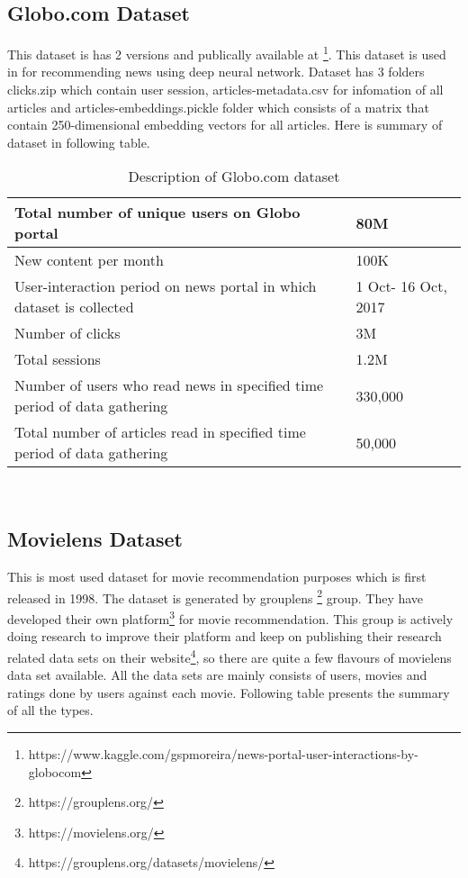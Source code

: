 \subsection{Globo.com Dataset}
This dataset is has 2 versions and publically available at \footnote{https://www.kaggle.com/gspmoreira/news-portal-user-interactions-by-globocom}. This dataset is used in \cite{N24} for recommending news using deep neural network. Dataset has 3 folders clicks.zip which contain user session, articles-metadata.csv for infomation of all articles and articles-embeddings.pickle folder which consists of a matrix that contain 250-dimensional embedding vectors for all articles.  Here is summary of 
dataset in following table.
\\
\begin{table}[!htbp] 
\centering
\footnotesize
\def\arraystretch{1.4}%
\centering
\begin{tabular}{|p{8cm}|p{2cm}|}
\hline
Total number of unique users on Globo portal & 80M
\\
\hline 
New content per month & 100K
\\
\hline 
User-interaction period on news portal in which dataset is collected& 1 Oct- 16 Oct, 2017
\\
\hline 
Number of clicks & 3M
\\
\hline 
Total sessions &1.2M
\\
\hline 
Number of users who read news in specified time period of data gathering & 330,000
\\
\hline 
Total number of articles read in specified time period of data gathering & 50,000
\\
\hline
\end{tabular}

\caption{Description of Globo.com dataset}
\label{table:6}
\end{table}
\\
\subsection{Movielens Dataset}
This is most used dataset for movie recommendation purposes which is first released in 1998. The dataset is generated by grouplens \footnote{https://grouplens.org/} group. They have developed their own platform\footnote{https://movielens.org/} for movie recommendation. This group is actively doing research to improve their platform and keep on publishing their research related data sets on their website\footnote{https://grouplens.org/datasets/movielens/}, so there are quite a few flavours of movielens data set available. All the data sets are mainly consists of users, movies and ratings done by users against each movie. Following table presents the summary of all the types.
\\\cite{N28}

